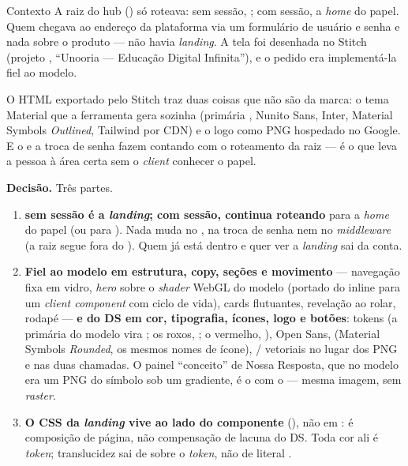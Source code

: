 \begin{especificacao}{Contexto}
A raiz do hub (\rota{/}) só roteava: sem sessão, ; com sessão, a
\emph{home} do papel. Quem chegava ao endereço da plataforma via um formulário
de usuário e senha e nada sobre o produto --- não havia \emph{landing}. A tela
foi desenhada no Stitch (projeto , ``Unooria ---
Educação Digital Infinita''), e o pedido era implementá-la fiel ao modelo.

O HTML exportado pelo Stitch traz duas coisas que não são da marca: o tema
Material que a ferramenta gera sozinha (primária , Nunito Sans,
Inter, Material Symbols \emph{Outlined}, Tailwind por CDN) e o logo como PNG
hospedado no Google. E o  e a troca de senha fazem
 contando com o roteamento da raiz --- é o que leva a
pessoa à área certa sem o \emph{client} conhecer o papel.
\end{especificacao}

\textbf{Decisão.} Três partes.

\begin{enumerate}
  \item \textbf{\rota{/} sem sessão é a \emph{landing}; com sessão, continua
    roteando} para a \emph{home} do papel (ou para ). Nada
    muda no , na troca de senha nem no \emph{middleware} (a raiz
    segue fora do ). Quem já está dentro e quer ver a \emph{landing}
    sai da conta.
  \item \textbf{Fiel ao modelo em estrutura, copy, seções e movimento} ---
    navegação fixa em vidro, \emph{hero} sobre o \emph{shader} WebGL do modelo
    (portado do  inline para um \emph{client component} com ciclo
    de vida), cards flutuantes, revelação ao rolar, rodapé --- \textbf{e do DS em
    cor, tipografia, ícones, logo e botões}: tokens  (a primária
    do modelo vira ; os roxos, ; o
    vermelho, ), Open Sans,  (Material Symbols
    \emph{Rounded}, os mesmos nomes de ícone), /
    vetoriais no lugar dos PNG e  nas duas chamadas. O painel
    ``conceito'' de Nossa Resposta, que no modelo era um PNG do símbolo sob um
    gradiente, é o  com o  ---
    mesma imagem, sem \emph{raster}.
  \item \textbf{O CSS da \emph{landing} vive ao lado do componente}
    (), não em : é
    composição de página, não compensação de lacuna do DS. Toda cor ali é
    \emph{token}; translucidez sai de  sobre o \emph{token}, não
    de literal .
\end{enumerate}

